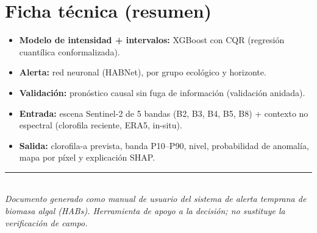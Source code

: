 \documentclass[11pt]{article}
\begin{document}
\section{Ficha t\'ecnica (resumen)}
\begin{itemize}
  \item \textbf{Modelo de intensidad + intervalos:} XGBoost con CQR (regresi\'on cuant\'ilica
  conformalizada).
  \item \textbf{Alerta:} red neuronal (HABNet), por grupo ecol\'ogico y horizonte.
  \item \textbf{Validaci\'on:} pron\'ostico causal sin fuga de informaci\'on (validaci\'on
  anidada).
  \item \textbf{Entrada:} escena Sentinel-2 de 5 bandas (B2, B3, B4, B5, B8) + contexto no
  espectral (clorofila reciente, ERA5, in-situ).
  \item \textbf{Salida:} clorofila-a prevista, banda P10--P90, nivel, probabilidad de
  anomal\'ia, mapa por p\'ixel y explicaci\'on SHAP.
\end{itemize}

\vspace{1cm}
{\color{lineac}\rule{\textwidth}{0.6pt}}\\[0.3cm]
{\small\itshape\color{aguaOsc} Documento generado como manual de usuario del sistema de
alerta temprana de biomasa algal (HABs). Herramienta de apoyo a la decisi\'on; no
sustituye la verificaci\'on de campo.}
\end{document}
